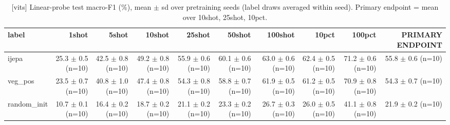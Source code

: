 \begin{table}[t]
\centering
\small
\caption{[vits] Linear-probe test macro-F1 (\%), mean $\pm$ sd over pretraining seeds (label draws averaged within seed). Primary endpoint = mean over 10shot, 25shot, 10pct.}
\label{tab:main_results_probe}
\begin{tabular}{lrrrrrrrrr}
\toprule
label & 1shot & 5shot & 10shot & 25shot & 50shot & 100shot & 10pct & 100pct & PRIMARY ENDPOINT \\
\midrule
ijepa & 25.3 $\pm$ 0.5 (n=10) & 42.5 $\pm$ 0.8 (n=10) & 49.2 $\pm$ 0.8 (n=10) & 55.9 $\pm$ 0.6 (n=10) & 60.1 $\pm$ 0.6 (n=10) & 63.0 $\pm$ 0.6 (n=10) & 62.4 $\pm$ 0.5 (n=10) & 71.2 $\pm$ 0.6 (n=10) & 55.8 $\pm$ 0.6 (n=10) \\
veg\_pos & 23.5 $\pm$ 0.7 (n=10) & 40.8 $\pm$ 1.0 (n=10) & 47.4 $\pm$ 0.8 (n=10) & 54.3 $\pm$ 0.8 (n=10) & 58.8 $\pm$ 0.7 (n=10) & 61.9 $\pm$ 0.5 (n=10) & 61.2 $\pm$ 0.5 (n=10) & 70.9 $\pm$ 0.8 (n=10) & 54.3 $\pm$ 0.7 (n=10) \\
random\_init & 10.7 $\pm$ 0.1 (n=10) & 16.4 $\pm$ 0.2 (n=10) & 18.7 $\pm$ 0.2 (n=10) & 21.1 $\pm$ 0.2 (n=10) & 23.3 $\pm$ 0.2 (n=10) & 26.7 $\pm$ 0.3 (n=10) & 26.0 $\pm$ 0.5 (n=10) & 41.1 $\pm$ 0.8 (n=10) & 21.9 $\pm$ 0.2 (n=10) \\
\bottomrule
\end{tabular}
\end{table}
